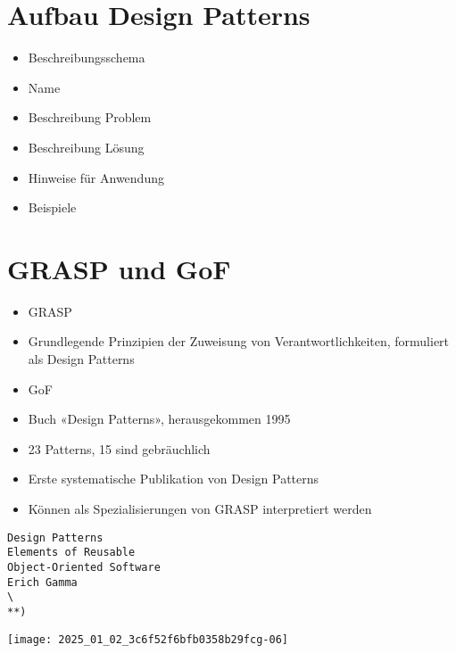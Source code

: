 \documentclass[10pt]{article}
\begin{document}
\section*{Aufbau Design Patterns}
\begin{itemize}
  \item Beschreibungsschema
  \item Name
  \item Beschreibung Problem
  \item Beschreibung Lösung
  \item Hinweise für Anwendung
  \item Beispiele
\end{itemize}

\section*{GRASP und GoF}
\begin{itemize}
  \item GRASP
  \item Grundlegende Prinzipien der Zuweisung von Verantwortlichkeiten, formuliert als Design Patterns
  \item GoF
  \item Buch «Design Patterns», herausgekommen 1995
  \item 23 Patterns, 15 sind gebräuchlich
  \item Erste systematische Publikation von Design Patterns
  \item Können als Spezialisierungen von GRASP interpretiert werden
\end{itemize}

\begin{verbatim}
Design Patterns
Elements of Reusable
Object-Oriented Software
Erich Gamma
\
**)
\end{verbatim}

\begin{center}
\texttt{[image: 2025\_01\_02\_3c6f52f6bfb0358b29fcg-06]}
\end{center}
\end{document}

